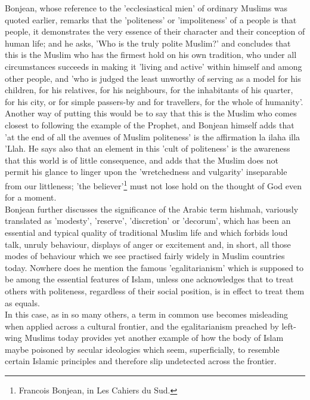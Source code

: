 \documentclass[11pt, b5paper, twoside]{book}
\begin{document}
Bonjean, whose reference to the 'ecclesiastical mien' of ordinary Muslims was quoted earlier, remarks 
that the 'politeness' or 'impoliteness' of a people is that people, it demonstrates the very essence 
of their character and their conception of human life; and he asks, 'Who is the truly polite Muslim?' 
and concludes that this is the Muslim who has the firmest hold on his own tradition, who under all 
circumstances succeeds in making it 'living and active' within himself and among other people, and 
'who is judged the least unworthy of serving as a model for his children, for his relatives, for his 
neighbours, for the inhabitants of his quarter, for his city, or for simple passers-by and for 
travellers, for the whole of humanity'. Another way of putting this would be to say that this is the 
Muslim who comes closest to following the example of the Prophet, and Bonjean himself adds that 'at 
the end of all the avenues of Muslim politeness' is the affirmation la ilaha illa 'Llah. He says also 
that an element in this 'cult of politeness' is the awareness that this world is of little 
consequence, and adds that the Muslim does not permit his glance to linger upon the 'wretchedness and 
vulgarity' inseparable from our littleness; 'the believer'\footnote{Francois Bonjean, in Les Cahiers du Sud.} must not lose hold on the thought of God even for a moment. \\

Bonjean further discusses the significance of the Arabic term hishmah, variously translated as 
'modesty', 'reserve', 'discretion' or 'decorum', which has been an essential and typical quality of 
traditional Muslim life and which forbids loud talk, unruly behaviour, displays of anger or 
excitement and, in short, all those modes of behaviour which we see practised fairly widely in Muslim 
countries today. Nowhere does he mention the famous 'egalitarianism' which is supposed to be among 
the essential features of Islam, unless one acknowledges that to treat others with politeness, 
regardless of their social position, is in effect to treat them as equals. \\

In this case, as in so many others, a term in common use becomes misleading when applied across a 
cultural frontier, and the egalitarianism preached by left-wing Muslims today provides yet another 
example of how the body of Islam maybe poisoned by secular ideologies which seem, superficially, to 
resemble certain Islamic principles and therefore slip undetected across the frontier. \\
\end{document}
